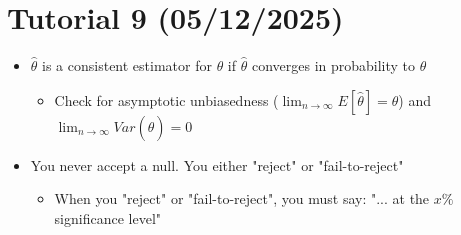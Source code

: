 \documentclass{article}
\begin{document}
\section{Tutorial 9 (05/12/2025)}
\begin{itemize}
    \item $\hat{\theta}$ is a consistent estimator for $\theta$ if $\hat{\theta}$ converges in probability to $\theta$
    \begin{itemize}
        \item Check for asymptotic unbiasedness ($\lim_{n\rightarrow \infty} E[\hat{\theta}] = \theta$) and $\lim_{n \rightarrow \infty} Var(\hat{\theta}) = 0$
    \end{itemize}
    \item You never accept a null. You either "reject" or "fail-to-reject"
    \begin{itemize}
        \item When you "reject" or "fail-to-reject", you must say: "... at the $x\%$ significance level"
    \end{itemize}

\end{itemize}
\end{document}
